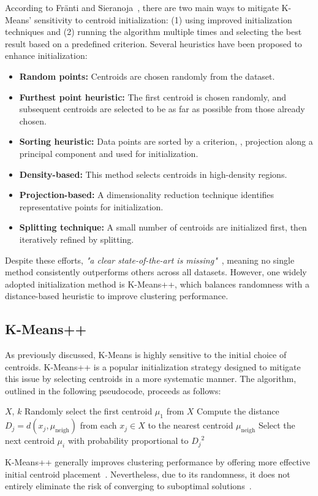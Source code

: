 \documentclass[10pt,twocolumn,letterpaper]{article}
\begin{document}
According to Fränti and Sieranoja~\cite{FRANTI201995}, there are two main ways
to mitigate K-Means’ sensitivity to centroid initialization: (1) using improved
initialization techniques and (2) running the algorithm multiple times and
selecting the best result based on a predefined criterion. Several heuristics
have been proposed to enhance initialization:
\begin{itemize}
    \item \textbf{Random points:} Centroids are chosen randomly from the dataset.
    \item \textbf{Furthest point heuristic:} The first centroid is chosen randomly, and subsequent centroids are selected to be as far as possible from those already chosen.
    \item \textbf{Sorting heuristic:} Data points are sorted by a criterion, \eg, projection along a principal component and used for initialization.
    \item \textbf{Density-based:} This method selects centroids in high-density regions.
    \item \textbf{Projection-based:} A dimensionality reduction technique identifies representative points for initialization.
    \item \textbf{Splitting technique:} A small number of centroids are initialized first, then iteratively refined by splitting.
\end{itemize}
Despite these efforts, \textit{"a clear state-of-the-art is
    missing"}~\cite{FRANTI201995}, meaning no single method consistently
outperforms others across all datasets. However, one widely adopted
initialization method is K-Means++, which balances randomness with a
distance-based heuristic to improve clustering performance.


\subsection{K-Means++}\label{subsec:k-means++}

As previously discussed, K-Means is highly sensitive to the initial choice of
centroids. K-Means++ is a popular initialization strategy designed to mitigate
this issue by selecting centroids in a more systematic manner. The algorithm,
outlined in the following pseudocode, proceeds as follows:
\begin{algorithmic}[1]
    \Require $X$, $k$
    \State Randomly select the first centroid $\mu_1$ from $X$
    \State Compute the distance $D_j=d(x_j, \mu_{\text{neigh}})$ from each $x_j\in X$ to the nearest centroid $\mu_{\text{neigh}}$
    \State Select the next centroid $\mu_i$ with probability proportional to ${D_j}^2$
    \EndFor
\end{algorithmic}
K-Means++ generally improves clustering performance by offering more effective
initial centroid placement~\cite{FRANTI201995}. Nevertheless, due to its
randomness, it does not entirely eliminate the risk of converging to
suboptimal solutions~\cite{deuschle2019, Abdullah10601123}.
\end{document}
